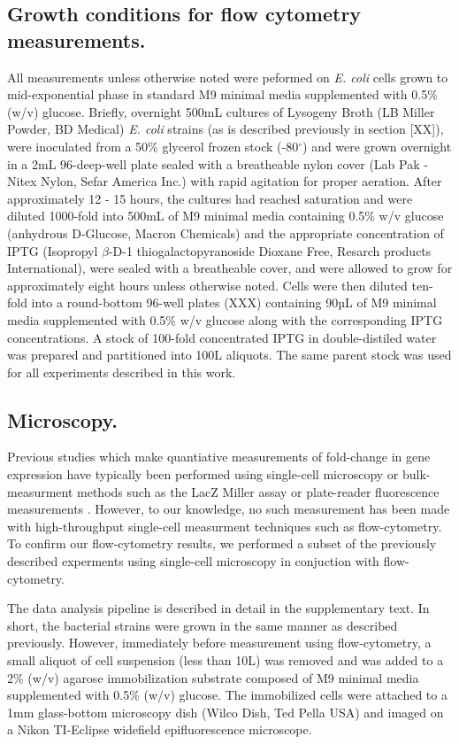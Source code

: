 \subsection{Growth conditions for flow cytometry measurements.}
All measurements unless otherwise noted were peformed on \textit{E. coli} cells
grown to mid-exponential phase in standard M9 minimal media supplemented with
0.5\% (w/v) glucose. Briefly, overnight 500mL cultures of Lysogeny Broth (LB
Miller Powder, BD Medical) \textit{E. coli} strains (as is described previously
in section [XX]), were inoculated from a 50\% glycerol frozen stock
(-80$^\circ$) and were grown overnight in a 2mL 96-deep-well plate sealed with
a breatheable nylon cover (Lab Pak - Nitex Nylon, Sefar America Inc.) with
rapid agitation for proper aeration. After approximately 12 - 15 hours, the
cultures had reached saturation and were diluted 1000-fold into 500mL of M9
minimal media containing 0.5\% w/v glucose (anhydrous D-Glucose, Macron
Chemicals) and the appropriate concentration of IPTG (Isopropyl $\beta$-D-1
thiogalactopyranoside Dioxane Free, Resarch products International), were
sealed with a breatheable cover, and were allowed to grow for approximately
eight hours unless otherwise noted. Cells were then diluted ten-fold into a
round-bottom 96-well plates (XXX) containing 90µL of M9 minimal media
supplemented with 0.5\% w/v glucose along with the corresponding IPTG
concentrations. A stock of 100-fold concentrated IPTG in double-distiled water
was prepared and partitioned into 100\textmu L aliquots. The same parent stock
was used for all experiments described in this work.

\subsection{Microscopy.}
Previous studies which make quantiative measurements of fold-change in gene
expression have typically been performed using single-cell microscopy
\cite{Brewster2014, Jones2014} or bulk-measurment methods such as the LacZ
Miller assay or plate-reader fluorescence measurements \cite{Garcia2011,
Razo-Mejia2014}. However, to our knowledge, no such measurement has been made
with high-throughput single-cell  measurment techniques such as flow-cytometry.
To confirm our flow-cytometry results, we performed a subset of the previously
described experments using  single-cell microscopy in conjuction with flow-
cytometry.

The data analysis pipeline is described in detail in the supplementary text. In
short, the bacterial strains were grown in the same manner as described
previously. However, immediately before measurement using flow-cytometry, a
small aliquot of cell suspension (less than 10\textmu L) was removed and was
added to a 2\% (w/v) agarose immobilization substrate composed of M9 minimal
media supplemented with 0.5\% (w/v) glucose. The immobilized cells were
attached to a 1mm glass-bottom microscopy dish (Wilco Dish, Ted Pella USA) and
imaged on a Nikon TI-Eclipse widefield epifluorescence microscope.

